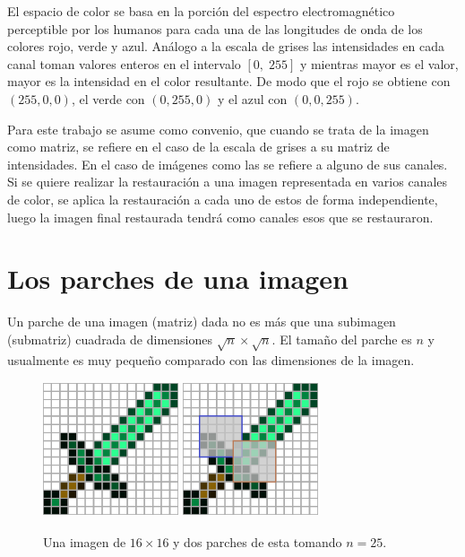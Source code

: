 El espacio de color \RGB se basa en la porción del espectro electromagnético perceptible por los humanos para cada una de las longitudes de onda de los colores rojo, verde y azul. An\'alogo a la escala de grises las intensidades en cada canal toman valores enteros en el intervalo $[0,\; 255]$ y mientras mayor es el valor, mayor es la intensidad en el color resultante. De modo que el rojo se obtiene con $(255,0,0)$, el verde con $(0,255,0)$ y el azul con $(0,0,255)$.

Para este trabajo se asume como convenio, que cuando se trata de la imagen como matriz, se refiere en el caso de la escala de grises a su matriz de intensidades. En el caso de im\'agenes como las \RGB se refiere a alguno de sus canales. Si se quiere realizar la restauraci\'on a una imagen representada en varios canales de color, se aplica la restauraci\'on a cada uno de estos de forma independiente, luego la imagen final restaurada tendr\'a como canales esos que se restauraron.


\section{Los parches de una imagen}\label{sec:patches}

\begin{definition}
	Un parche  de una imagen (matriz) dada no es m\'as que una subimagen (submatriz) cuadrada de dimensiones $\sqrt{n} \times \sqrt{n}$. El tamaño del parche es $n$ y usualmente es muy peque\~no comparado con las dimensiones de la imagen.
\end{definition}

\begin{figure}[h]
	\centering
	\includegraphics[width=4cm, height=4cm]{Graphics/diamon_sword.png}
	\hspace{1cm}
	\includegraphics[width=4cm, height=4cm]{Graphics/diamon_sword_with_patches.png}
	\caption{Una imagen de $16 \times 16$ y dos parches de esta tomando $n = 25$.}
	\label{ex:patches}
\end{figure}

